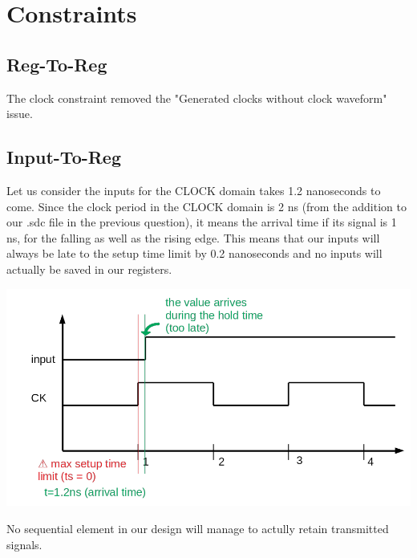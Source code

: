 \documentclass[a4paper]{article}
\begin{document}
\section{Constraints}
\subsection{Reg-To-Reg}
The clock constraint removed the "Generated clocks without clock waveform" issue.

\subsection{Input-To-Reg}
Let us consider the inputs for the CLOCK domain takes 1.2 nanoseconds to come. Since the clock period in the
CLOCK domain is 2 ns (from the addition to our .sdc file in the previous question), it means the arrival time
if its signal is 1 ns, for the falling as well as the rising edge. This means that our inputs will always be
late to the setup time limit by 0.2 nanoseconds and no inputs will actually be saved in our registers.

\begin{center}
  \includegraphics[width=14cm]{./timing_problem.png}
\end{center}

No sequential element in our design will manage to actully retain transmitted signals.
\end{document}
